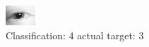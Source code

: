 \begin{figure}[h!]
\begin{center}
\includegraphics[width=0.60\columnwidth]{figures/ID29_class_4_target_3.png}
\end{center}
\caption{ Classification: 4 actual target: 3}
\label{fig:ID29_class_4_target_3}
\end{figure}
